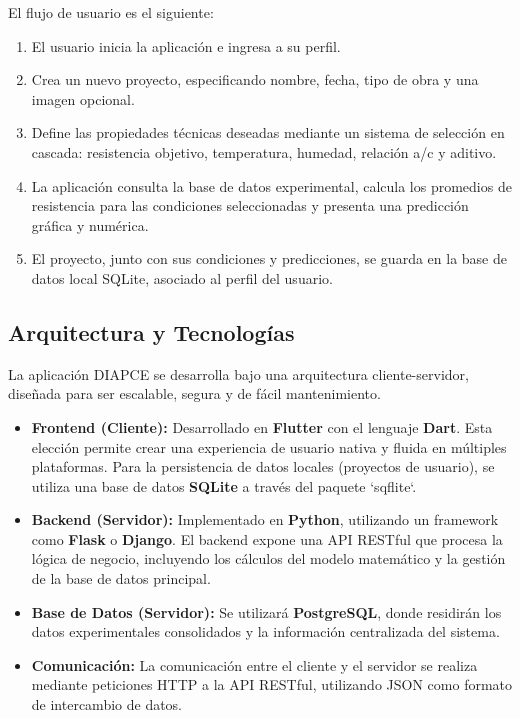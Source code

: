 \documentclass[12pt, letterpaper]{article}
\begin{document}
El flujo de usuario es el siguiente:
\begin{enumerate}
    \item El usuario inicia la aplicación e ingresa a su perfil.
    \item Crea un nuevo proyecto, especificando nombre, fecha, tipo de obra y una imagen opcional.
    \item Define las propiedades técnicas deseadas mediante un sistema de selección en cascada: resistencia objetivo, temperatura, humedad, relación a/c y aditivo.
    \item La aplicación consulta la base de datos experimental, calcula los promedios de resistencia para las condiciones seleccionadas y presenta una predicción gráfica y numérica.
    \item El proyecto, junto con sus condiciones y predicciones, se guarda en la base de datos local SQLite, asociado al perfil del usuario.
\end{enumerate}

\subsection{Arquitectura y Tecnologías}
La aplicación DIAPCE se desarrolla bajo una arquitectura cliente-servidor, diseñada para ser escalable, segura y de fácil mantenimiento.
\begin{itemize}
    \item \textbf{Frontend (Cliente):} Desarrollado en \textbf{Flutter} con el lenguaje \textbf{Dart}. Esta elección permite crear una experiencia de usuario nativa y fluida en múltiples plataformas. Para la persistencia de datos locales (proyectos de usuario), se utiliza una base de datos \textbf{SQLite} a través del paquete `sqflite`.
    \item \textbf{Backend (Servidor):} Implementado en \textbf{Python}, utilizando un framework como \textbf{Flask} o \textbf{Django}. El backend expone una API RESTful que procesa la lógica de negocio, incluyendo los cálculos del modelo matemático y la gestión de la base de datos principal.
    \item \textbf{Base de Datos (Servidor):} Se utilizará \textbf{PostgreSQL}, donde residirán los datos experimentales consolidados y la información centralizada del sistema.
    \item \textbf{Comunicación:} La comunicación entre el cliente y el servidor se realiza mediante peticiones HTTP a la API RESTful, utilizando JSON como formato de intercambio de datos.
\end{itemize}
\end{document}
